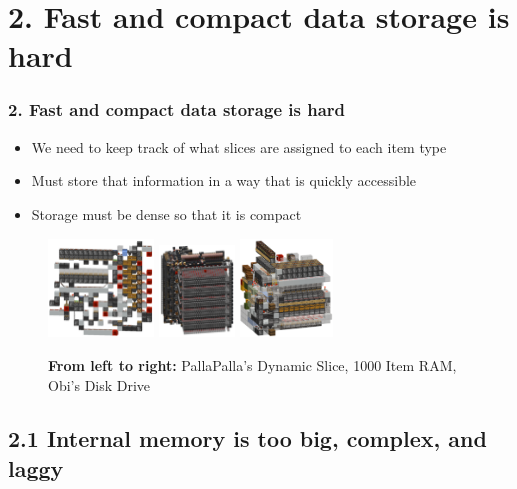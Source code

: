 \documentclass[aspectratio=169]{beamer}
\begin{document}
\section{2. Fast and compact data storage is hard}

\begin{frame}
	\frametitle{2. Fast and compact data storage is hard}

    \begin{itemize}
		\item We need to keep track of what slices are assigned to each item type
        \item Must store that information in a way that is quickly accessible
        \item Storage must be dense so that it is compact
	\end{itemize}

    \begin{figure}
        \includegraphics[width=0.25\textwidth]{pallaslice2.png}
        \hfill
        \includegraphics[width=0.18\textwidth]{bigram.png}
        \hfill
        \includegraphics[width=0.22\textwidth]{diskdrive.png}
        \hfill

        \caption{\textbf{From left to right:} PallaPalla's Dynamic Slice, 1000 Item RAM, Obi's Disk Drive}
	\end{figure}
\end{frame}

\subsection{2.1 Internal memory is too big, complex, and laggy}
\end{document}
